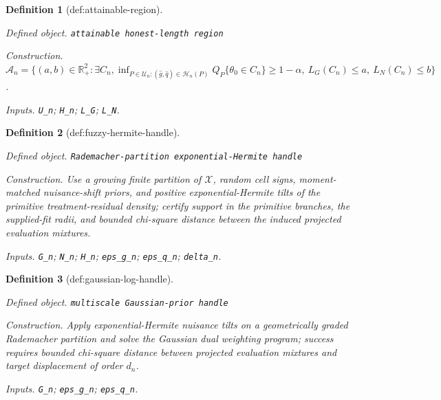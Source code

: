 \documentclass{article}
\newtheorem{definition}{Definition}
\begin{document}
\begin{definition}[def:attainable-region]\label{def:attainable-region}
\par\smallskip\noindent\emph{Defined object.} \texttt{attainable honest-\allowbreak{}length region}
\par\smallskip\noindent\emph{Construction.} \(\mathcal A_n=\{(a,b)\in\mathbb R_+^2:\exists C_n,\inf_{P\in\mathcal U_n:(\widehat g,\widehat q)\in\mathcal H_n(P)}Q_P\{\theta_0\in C_n\}\ge1-\alpha,\ L_G(C_n)\le a,\ L_N(C_n)\le b\}\).
\par\smallskip\noindent\emph{Inputs.} \texttt{U\_\allowbreak{}n}; \texttt{H\_\allowbreak{}n}; \texttt{L\_\allowbreak{}G}; \texttt{L\_\allowbreak{}N}.
\end{definition}

\begin{definition}[def:fuzzy-hermite-handle]\label{def:fuzzy-hermite-handle}
\par\smallskip\noindent\emph{Defined object.} \texttt{Rademacher-\allowbreak{}partition exponential-\allowbreak{}Hermite handle}
\par\smallskip\noindent\emph{Construction.} Use a growing finite partition of \(\mathcal X\), random cell signs, moment-matched nuisance-shift priors, and positive exponential-Hermite tilts of the primitive treatment-residual density; certify support in the primitive branches, the supplied-fit radii, and bounded chi-square distance between the induced projected evaluation mixtures.
\par\smallskip\noindent\emph{Inputs.} \texttt{G\_\allowbreak{}n}; \texttt{N\_\allowbreak{}n}; \texttt{H\_\allowbreak{}n}; \texttt{eps\_\allowbreak{}g\_\allowbreak{}n}; \texttt{eps\_\allowbreak{}q\_\allowbreak{}n}; \texttt{delta\_\allowbreak{}n}.
\end{definition}

\begin{definition}[def:gaussian-log-handle]\label{def:gaussian-log-handle}
\par\smallskip\noindent\emph{Defined object.} \texttt{multiscale Gaussian-\allowbreak{}prior handle}
\par\smallskip\noindent\emph{Construction.} Apply exponential-Hermite nuisance tilts on a geometrically graded Rademacher partition and solve the Gaussian dual weighting program; success requires bounded chi-square distance between projected evaluation mixtures and target displacement of order \(d_n\).
\par\smallskip\noindent\emph{Inputs.} \texttt{G\_\allowbreak{}n}; \texttt{eps\_\allowbreak{}g\_\allowbreak{}n}; \texttt{eps\_\allowbreak{}q\_\allowbreak{}n}.
\end{definition}
\end{document}
